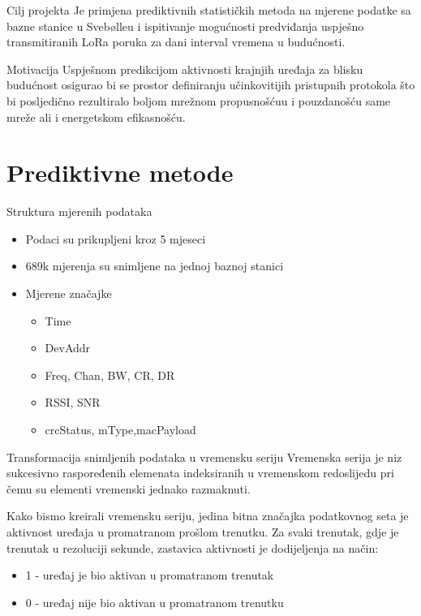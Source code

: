\documentclass{beamer}
\begin{document}
  \begin{frame}{Cilj projekta}
    Je primjena prediktivnih statističkih metoda na mjerene podatke sa bazne stanice u Svebølleu i ispitivanje mogućnosti predviđanja \alert{uspješno transmitiranih LoRa poruka za dani interval vremena u budućnosti}.
  \end{frame}

  \begin{frame}{Motivacija}
    Uspješnom predikcijom aktivnosti krajnjih uređaja za blisku budućnost osigurao bi se prostor definiranju učinkovitijih pristupnih protokola što bi posljedično rezultiralo boljom mrežnom propusnošćuu i pouzdanošću same mreže ali i energetskom efikasnošću.
  \end{frame}

  \section{Prediktivne metode}
  \begin{frame}{Struktura mjerenih podataka}
    \begin{itemize}
      \item Podaci su prikupljeni kroz 5 mjeseci
      \item 689k mjerenja su snimljene na jednoj baznoj stanici
      \item Mjerene značajke\begin{itemize}
        \item Time
        \item DevAddr
        \item Freq, Chan, BW, CR, DR 
        \item RSSI, SNR  
        \item crcStatus, mType,macPayload 
      \end{itemize}
    \end{itemize}
  \end{frame}

  \begin{frame}{Transformacija snimljenih podataka u vremensku seriju}
    \alert{Vremenska serija} je niz sukcesivno raspoređenih elemenata indeksiranih u vremenskom redoslijedu pri čemu su elementi vremenski jednako razmaknuti.

    Kako bismo kreirali vremensku seriju, jedina bitna značajka podatkovnog seta je aktivnost uređaja u promatranom prošlom trenutku.
    Za svaki trenutak, gdje je trenutak u rezoluciji sekunde, zastavica aktivnosti je dodijeljenja na način:
    \begin{itemize}
      \item 1 - uređaj je bio aktivan u promatranom trenutak
      \item 0 - uređaj nije bio aktivan u promatranom trenutku
    \end{itemize}
  \end{frame}
\end{document}
